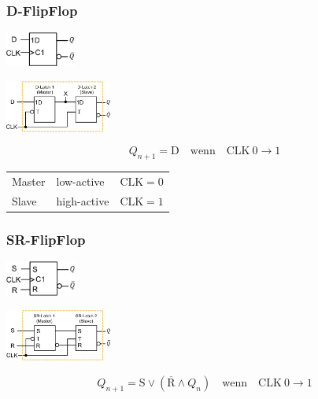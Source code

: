 \subsubsection{D-FlipFlop}
\begin{center}
    \begin{minipage}[c]{0.4\linewidth}
        \includegraphics[width = 23mm]{images/d_ff.jpeg}
    \end{minipage}
    \hfill
    \begin{minipage}[c]{0.55\linewidth}
        \includegraphics[width = 35mm]{images/d_ff_cir.jpeg}
    \end{minipage}
\end{center}
\begin{equation*}
    Q_{n + 1} = \text{D} \quad \text{wenn} \quad \text{CLK}~0\rightarrow 1 
\end{equation*}
\begin{flushleft}
    \begin{tabular}{l l l}
        Master & low-active & $\text{CLK} = 0$\\
        Slave & high-active & $\text{CLK} = 1$\\
    \end{tabular}
\end{flushleft}
\subsubsection{SR-FlipFlop}
\begin{center}
    \begin{minipage}[c]{0.4\linewidth}
        \includegraphics[width = 23mm]{images/srt_ff.jpeg}
    \end{minipage}
    \hfill
    \begin{minipage}[c]{0.55\linewidth}
        \includegraphics[width = 35mm]{images/srt_ff_cir.jpeg}
    \end{minipage}
\end{center}
\begin{equation*}
    Q_{n + 1} = \text{S} \lor \left(\overline{\text{R}} \land Q_n\right) \quad \text{wenn} \quad \text{CLK}~0\rightarrow 1 
\end{equation*}
